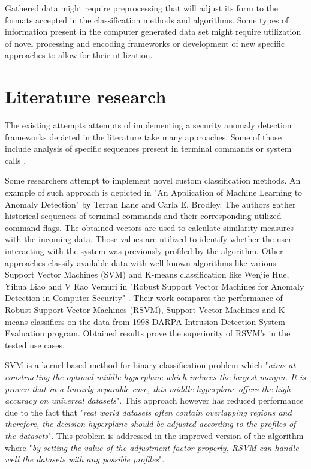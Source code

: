 \documentclass[a4paper,twoside,12pt]{book}
\begin{document}
Gathered data might require preprocessing that will adjust its form to the formats accepted in the
classification methods and algorithms. Some types of information present in the computer 
generated data set might require utilization of novel processing and encoding frameworks or 
development of new specific approaches to allow for their utilization.  

\section{Literature research}

The existing attempts attempts of implementing a security anomaly detection frameworks depicted in the 
literature take many approaches. Some of those include analysis of specific sequences
present in terminal commands \cite{bib:lane1997application} or system calls \cite{bib:forest}. 

Some researchers attempt to implement novel custom classification methods. An example of such 
approach is depicted in "An Application of Machine Learning to Anomaly Detection" by Terran Lane 
and Carla E. Brodley\cite{bib:lane1997application}. The authors gather historical sequences of
terminal commands and their corresponding utilized command flags. The obtained vectors are used
to calculate similarity measures with the incoming data. Those values are utilized to identify 
whether the user interacting with the system was previously profiled by the algorithm.
Other approaches classify available data with well known algorithms like various Support Vector 
Machines (SVM) and K-means classification like Wenjie Hue, Yihua Liao and V Rao Vemuri in "Robust Support Vector 
Machines for Anomaly Detection in Computer Security" \cite{bib:rsvm}. Their work compares the 
performance of Robust Support Vector Machines (RSVM), Support Vector Machines and K-means classifiers
on the data from 1998 DARPA Intrusion Detection System Evaluation program. Obtained results
prove the superiority of RSVM's in the tested use cases. 

SVM is a kernel-based method for binary classification problem which "\textit{aims at constructing 
the optimal middle hyperplane which induces the largest margin. It is proven that in a linearly 
separable case, this middle hyperplane offers the high accuracy on universal datasets}". This 
approach however has reduced performance due to the fact that "\textit{real world datasets often contain 
overlapping regions and therefore, the decision hyperplane should be adjusted according to the 
profiles of the datasets}". This problem is addressed in the improved version of the algorithm
where "\textit{by setting the value of the adjustment factor properly, RSVM can handle well the datasets 
with any possible profiles}"\cite{bib:svmandrsvm}.
\end{document}
